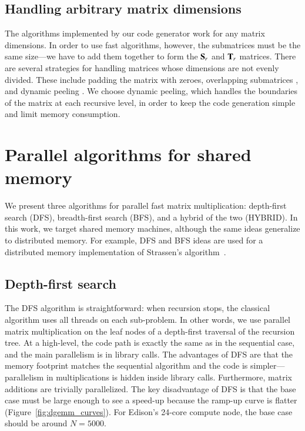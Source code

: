 \documentclass[preprint]{sigplanconf}
\newcommand{\M}[2][]{{\bm{#1\mathbf{\MakeUppercase{#2}}}}}
\begin{document}
\subsection{Handling arbitrary matrix dimensions}
\label{sec:all_dimensions}

The algorithms implemented by our code generator work for any matrix dimensions.
In order to use fast algorithms, however, the submatrices must be the same size---we have to add them together to form the $\M{S}_r$ and $\M{T}_r$ matrices.
There are several strategies for handling matrices whose dimensions are not evenly divided.
These include padding the matrix with zeroes, overlapping submatrices \cite{douglas1994gemmw}, and dynamic peeling \cite{thottethodi1998tuning}.
We choose dynamic peeling, which handles the boundaries of the matrix at each recursive level, in order to keep the code generation simple and limit memory consumption.

\section{Parallel algorithms for shared memory}
\label{sec:parallel}

We present three algorithms for parallel fast matrix multiplication: depth-first search (DFS), breadth-first search (BFS), and a hybrid of the two (HYBRID).
In this work, we target shared memory machines, although the same ideas generalize to distributed memory.
For example, DFS and BFS ideas are used for a distributed memory implementation of Strassen's algorithm~\cite{lipshitz2012communication}.

\subsection{Depth-first search}
\label{sec:par_dfs}

The DFS algorithm is straightforward: when recursion stops, the classical algorithm uses all threads on each sub-problem.
In other words, we use parallel matrix multiplication on the leaf nodes of a depth-first traversal of the recursion tree.
At a high-level, the code path is exactly the same as in the sequential case, and the main parallelism is in library calls.
The advantages of DFS are that the memory footprint matches the sequential algorithm and the code is simpler---parallelism in multiplications is hidden inside library calls.
Furthermore, matrix additions are trivially parallelized.
The key disadvantage of DFS is that the base case must be large enough to see a speed-up because the ramp-up curve is flatter (Figure~\ref{fig:dgemm_curves}).
For Edison's 24-core compute node, the base case should be around $N = 5000$.
\end{document}
